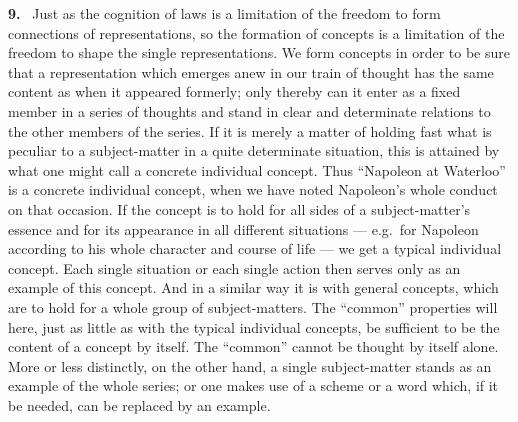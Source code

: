 \documentclass[12pt]{book}
\newcommand{\hnum}[1]{\noindent\textbf{#1.}~}
\newcommand{\opage}[1]{\marginnote{\footnotesize\textit{[#1]}}}
\begin{document}
\hnum{9} Just as the cognition of laws is a limitation of the freedom to form
connections of representations, so the formation of concepts is a limitation of
the freedom to shape the single representations. We form concepts in order to be
sure that a representation which emerges anew in our train of thought has the
same content as when it appeared formerly; only thereby can it enter as a fixed
member in a series of thoughts and stand in clear and determinate relations to
the other members of the series. If it is merely a matter of holding fast what
is peculiar to a subject-matter in a quite determinate situation, this is
attained by what one might call a concrete individual concept. Thus ``Napoleon
at Waterloo'' is a concrete individual concept, when we have noted Napoleon's
whole conduct on that occasion. If the concept is to hold for all sides of a
subject-matter's essence and for its appearance in all different situations ---
e.g.\ for Napoleon according to his whole character and course of life --- we get
a typical individual concept. Each single situation or each single action then
serves only as an example of this concept. And in a similar way it is with
general concepts, which are to hold for a whole group of subject-matters. The
``common'' properties will here, just as little as with the typical individual
concepts, be sufficient to be the content of a concept by itself. The ``common''
cannot be thought by itself alone. More or less distinctly, on the other hand, a
single subject-matter stands as an example of the whole series; or one \opage{49}makes use
of a scheme or a word which, if it be needed, can be replaced by an example.
\end{document}
